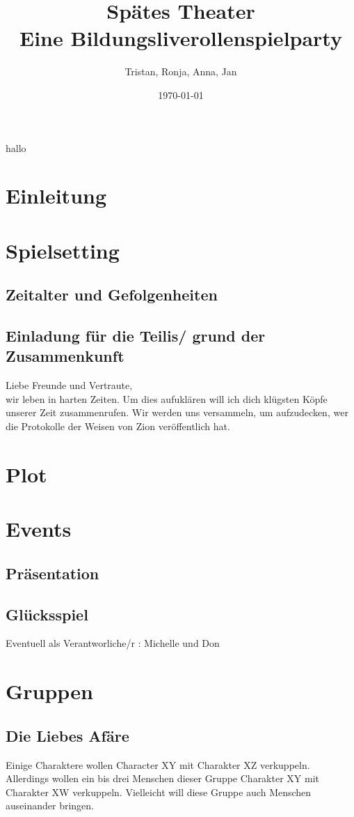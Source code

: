 \documentclass[12pt, a4paper, openany]{report}
\title{
    {Spätes Theater}\\
    {\large{Eine Bildungsliverollenspielparty}}\\
}
\author{Tristan, Ronja, Anna, Jan}
\date{\today}
\begin{document}
hallo

\maketitle
\frontmatter
\tableofcontents
\mainmatter

\chapter{Einleitung}

\chapter{Spielsetting}

\section{Zeitalter und Gefolgenheiten}

\section{Einladung für die Teilis/ grund der Zusammenkunft}
Liebe Freunde und Vertraute,\\
wir leben in harten Zeiten. 
Um dies aufuklären will ich dich klügsten Köpfe unserer Zeit zusammenrufen. 
Wir werden uns versammeln, um aufzudecken, wer die Protokolle der Weisen von Zion veröffentlich hat. 

\chapter{Plot}
\chapter{Events}
\section{Präsentation}
\section{Glücksspiel}
Eventuell als Verantworliche/r : Michelle und Don

\chapter{Gruppen}
\section{Die Liebes Afäre}
Einige Charaktere wollen Character XY mit Charakter XZ verkuppeln.
Allerdings wollen ein bis drei Menschen dieser Gruppe Charakter XY mit Charakter XW verkuppeln.
Vielleicht will diese Gruppe auch Menschen auseinander bringen.
\end{document}
